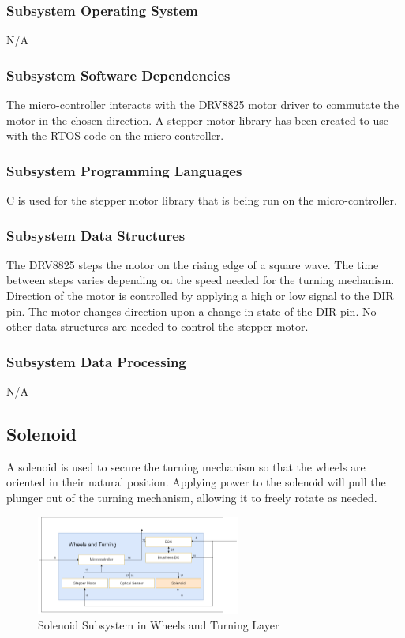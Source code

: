 \subsubsection{Subsystem Operating System}
N/A

\subsubsection{Subsystem Software Dependencies}
The micro-controller interacts with the DRV8825 motor driver to commutate the motor in the chosen direction. A stepper motor library has been created to use with the RTOS code on the micro-controller.

\subsubsection{Subsystem Programming Languages}
C is used for the stepper motor library that is being run on the micro-controller.

\subsubsection{Subsystem Data Structures}
The DRV8825 steps the motor on the rising edge of a square wave. The time between steps varies depending on the speed needed for the turning mechanism. Direction of the motor is controlled by applying a high or low signal to the DIR pin. The motor changes direction upon a change in state of the DIR pin. No other data structures are needed to control the stepper motor.

\subsubsection{Subsystem Data Processing}
N/A

\subsection{Solenoid}
A solenoid is used to secure the turning mechanism so that the wheels are oriented in their natural position. Applying power to the solenoid will pull the plunger out of the turning mechanism, allowing it to freely rotate as needed.

\begin{figure}[h!]
	\centering
 	\includegraphics[width=0.60\textwidth]{images/Keaton/Solenoid.png}
 \caption{Solenoid Subsystem in Wheels and Turning Layer}
\end{figure}

